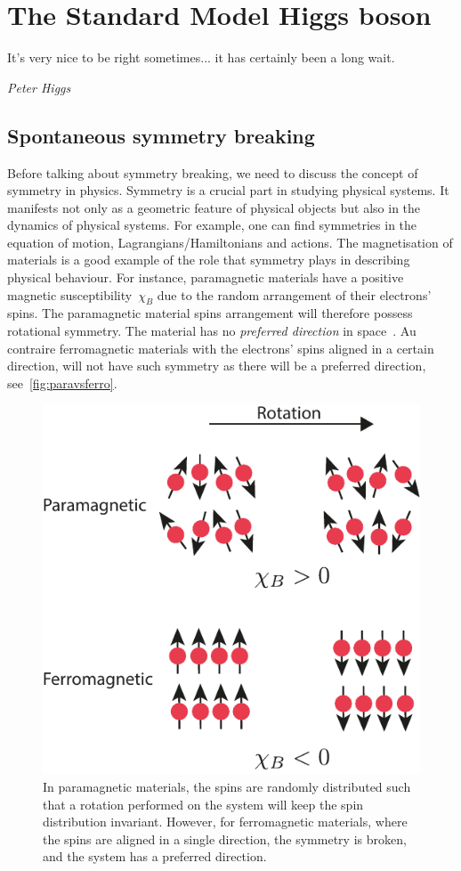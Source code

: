 \chapter{The Standard Model Higgs boson }\label{chap:HiggsSM}
\epigraph{	It's very nice to be right sometimes... it has certainly been a long wait.}{\textit{Peter Higgs }}

\section{Spontaneous symmetry breaking}
\par Before talking about symmetry breaking, we need to discuss the concept of symmetry in physics. Symmetry is a crucial part in studying physical systems. It manifests not only as a geometric feature of physical objects but also in the dynamics of physical systems. For example, one can find symmetries in the equation of motion, Lagrangians/Hamiltonians and actions. The magnetisation of materials is a good example of the role that symmetry plays in describing physical behaviour. For instance, {paramagnetic} materials have a positive magnetic susceptibility~$\chi_B$ due to the random arrangement of their electrons' spins.  The paramagnetic material spins arrangement will therefore possess rotational symmetry. The material has no \textit{ preferred direction} in space~\cite{minlos2000introduction}. Au contraire {ferromagnetic} materials with the electrons' spins aligned in a certain direction, will not have such symmetry as there will be a preferred direction, see~\autoref{fig:paravsferro}. 
\begin{figure}[htpb!]
    \centering  
   \includegraphics[width=0.36\linewidth]{./figures/ferrvspara}
    \caption{In paramagnetic materials, the spins are randomly distributed such that a rotation performed on the system will keep the spin distribution invariant. However, for ferromagnetic materials, where the spins are aligned in a single direction, the symmetry is broken, and the system has a preferred direction.}  \label{fig:paravsferro}
\end{figure}
